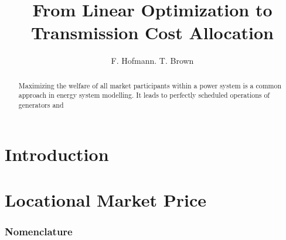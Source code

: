 \documentclass[11pt,twocolumn]{article}
\begin{document}
\title{From Linear Optimization to Transmission Cost Allocation}
\author{F. Hofmann. T. Brown}

\maketitle

\begin{abstract}
Maximizing the welfare of all market participants within a power system is a common approach in energy system modelling. It leads to perfectly scheduled operations of generators and  
\end{abstract}


\section{Introduction}



\section{Locational Market Price}

\subsubsection*{Nomenclature}
\end{document}
